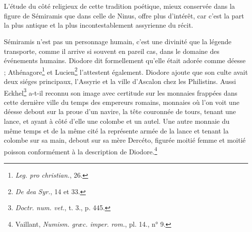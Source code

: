 \documentclass[a4paper, 11pt, oneside, landscape]{article}
\begin{document}
\bigskip
\centerline{\EightStarTaper}
\centerline{\EightStarTaper\EightStarTaper}
\bigskip
\clearpage
\section{}
\paragraph{}
L'étude du côté religieux de cette tradition poétique, mieux conservée dans la figure de Sémiramis que dans celle de Ninus, offre plus d'intérêt, car c'est la part la plus antique et la plus incontestablement assyrienne du récit.

Sémiramis n'est pas un personnage humain, c'est une divinité que la légende transporte, comme il arrive si souvent en pareil cas, dans le domaine des événements humains. Diodore dit formellement qu'elle était adorée comme déesse ; Athénagore\footnote{\emph{Leg. pro christian.}, 26.} et Lucien\footnote{\emph{De dea Syr.}, 14 et 33.} l'attestent également. Diodore ajoute que son culte avait deux siéges principaux, l'Assyrie et la ville d'Ascalon chez les Philistins. Aussi Eckhel\footnote{\emph{Doctr. num. vet.}, t. 3., p. 445.} a-t-il reconnu son image avec certitude sur les monnaies frappées dans cette dernière ville du temps des empereurs romains, monnaies où l'on voit une déesse debout sur la proue d'un navire, la tête couronnée de tours, tenant une lance, et ayant à côté d'elle une colombe et un autel. Une autre monnaie du même temps et de la même cité la représente armée de la lance et tenant la colombe sur sa main, debout sur sa mère Dercéto, figurée moitié femme et moitié poisson conformément à la description de Diodore.\footnote{Vaillant, \emph{Numism. græc. imper. rom.}, pl. 14., n° 9.}
\end{document}
